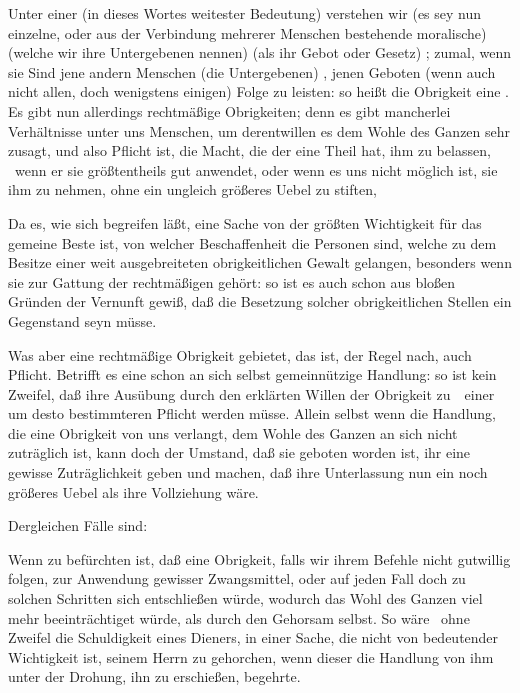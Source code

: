 \begin{aufza}
\item Unter einer  (in dieses Wortes weitester Bedeutung) verstehen wir  (es sey nun einzelne, oder aus der Verbindung mehrerer Menschen bestehende moralische)  (welche wir ihre Untergebenen nennen)  (als ihr Gebot oder Gesetz) ; zumal, wenn sie  Sind jene andern Menschen (die Untergebenen) , jenen Geboten (wenn auch nicht allen, doch wenigstens einigen) Folge zu leisten: so heißt die Obrigkeit eine . Es gibt nun allerdings rechtmäßige Obrigkeiten; denn es gibt mancherlei Verhältnisse unter uns Menschen, um derentwillen es dem Wohle des Ganzen sehr zusagt, und also Pflicht ist, die Macht, die der eine Theil hat, ihm zu belassen, \zB\  wenn er sie größtentheils gut anwendet, oder wenn es uns nicht möglich ist, sie ihm zu nehmen, ohne ein ungleich größeres Uebel zu stiften, \udgl\ 
\item Da es, wie sich begreifen läßt, eine Sache von der größten Wichtigkeit für das gemeine Beste ist, von welcher Beschaffenheit die Personen sind, welche zu dem Besitze einer weit ausgebreiteten obrigkeitlichen Gewalt gelangen, besonders wenn sie zur Gattung der rechtmäßigen gehört: so ist es auch schon aus bloßen Gründen der Vernunft gewiß, daß die Besetzung solcher obrigkeitlichen Stellen ein Gegenstand  seyn müsse.
\item Was aber eine rechtmäßige Obrigkeit gebietet, das ist, der Regel nach, auch Pflicht. Betrifft es eine schon an sich selbst gemeinnützige Handlung: so ist kein Zweifel, daß ihre Ausübung durch den erklärten Willen der Obrigkeit zu~\RWSeitenw{253}\ einer um desto bestimmteren Pflicht werden müsse. Allein selbst wenn die Handlung, die eine Obrigkeit von uns verlangt, dem Wohle des Ganzen an sich nicht zuträglich ist, kann doch der Umstand, daß sie geboten worden ist, ihr eine gewisse Zuträglichkeit geben und machen, daß ihre Unterlassung nun ein noch größeres Uebel als ihre Vollziehung wäre.\par
Dergleichen Fälle sind:
\begin{aufzb}
\item Wenn zu befürchten ist, daß eine Obrigkeit, falls wir ihrem Befehle nicht gutwillig folgen, zur Anwendung gewisser Zwangsmittel, oder auf jeden Fall doch zu solchen Schritten sich entschließen würde, wodurch das Wohl des Ganzen viel mehr beeinträchtiget würde, als durch den Gehorsam selbst. So wäre \zB\  ohne Zweifel die Schuldigkeit eines Dieners, in einer Sache, die nicht von bedeutender Wichtigkeit ist, seinem Herrn zu gehorchen, wenn dieser die Handlung von ihm unter der Drohung, ihn zu erschießen, begehrte.

\end{aufzb}
\end{aufza}

